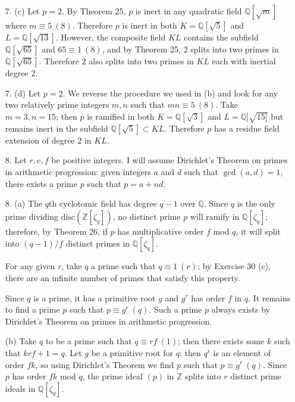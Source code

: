 \documentclass{article}
\newcommand{\Q}[0]{\mathbb{Q}}
\newcommand{\Z}[0]{\mathbb{Z}}
\newcommand{\disc}[1]{\text{disc}(#1)}
\newcommand{\modequiv}[3]{#1 \equiv #2\ (#3)}
\begin{document}
\begin{enumerate}
    \item[7. (c)] Let $p = 2$.  By Theorem 25, $p$ is inert in any quadratic field $\Q[\sqrt{m}]$ where $\modequiv{m}{5}{8}$.  Therefore $p$ is inert in both $K = \Q[\sqrt{5}]$ and $L = \Q[\sqrt{13}]$. However, the composite field $KL$ contains the subfield $\Q[\sqrt{65}]$ and $\modequiv{65}{1}{8}$, and by Theorem 25, $2$ splits into two primes in $\Q[\sqrt{65}]$.  Therefore $2$ also splits into two primes in $KL$ each with inertial degree 2.

    \item[7. (d)] Let $p = 2$.  We reverse the procedure we used in (b) and look for any two relatively prime integers $m, n$ such that $\modequiv{mn}{5}{8}$.  Take $m = 3, n = 15$; then $p$ is ramified in both $K = \Q[\sqrt{3}]$ and $L = \Q[\sqrt{15]}$ but remains inert in the subfield $\Q[\sqrt{5}] \subset KL$.  Therefore $p$ has a residue field extension of degree 2 in $KL$.

    \item[8.] Let $r, e, f$ be positive integers.  I will assume Dirichlet's Theorem on primes in arithmetic progression: given integers $a$ and $d$ such that $\gcd(a, d) = 1$, there exists a prime $p$ such that $p = a + nd$.

    \item[8. (a)] The $q$th cyclotomic field has degree $q - 1$ over $\Q$.  Since $q$ is the only prime dividing $\disc{\Z[\zeta_q]}$, no distinct prime $p$ will ramify in $\Q[\zeta_q]$; therefore, by Theorem 26, if $p$ has multiplicative order $f$ mod $q$, it will split into $(q - 1) / f$ distinct primes in $\Q[\zeta_q]$.

    For any given $r$, take $q$ a prime such that $q \equiv 1\ (r)$; by Exercise 30 (c), there are an infinite number of primes that satisfy this property.

    Since $q$ is a prime, it has a primitive root $g$ and $g^{r}$ has order $f$ in $q$.  It remains to find a prime $p$ such that $\modequiv{p}{g^{r}}{q}$.  Such a prime $p$ always exists by Dirichlet's Theorem on primes in arithmetic progression.

    \item[(b)] Take $q$ to be a prime such that $\modequiv{q}{rf}{1}$; then there exists some $k$ such that $krf + 1 = q$.  Let $g$ be a primitive root for $q$: then $q^{r}$ is an element of order $fk$, so using Dirichlet's Theorem we find $p$ such that $\modequiv{p}{g^{r}}{q}$.  Since $p$ has order $fk$ mod $q$, the prime ideal $(p)$ in $\Z$ splits into $r$ distinct prime ideals in $\Q[\zeta_{q}]$.


\end{enumerate}
\end{document}
